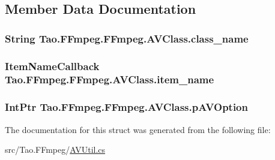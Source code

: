 \subsection{Member Data Documentation}
\hypertarget{struct_tao_1_1_f_fmpeg_1_1_f_fmpeg_1_1_a_v_class_a089edfda9da1bd06b77b27a72ace1340}{
\subsubsection[{class\_\-name}]{\setlength{\rightskip}{0pt plus 5cm}String {\bf Tao.FFmpeg.FFmpeg.AVClass.class\_\-name}}}
\label{struct_tao_1_1_f_fmpeg_1_1_f_fmpeg_1_1_a_v_class_a089edfda9da1bd06b77b27a72ace1340}
\hypertarget{struct_tao_1_1_f_fmpeg_1_1_f_fmpeg_1_1_a_v_class_a23db01a0e2f29743ffc51d507482302b}{
\subsubsection[{item\_\-name}]{\setlength{\rightskip}{0pt plus 5cm}ItemNameCallback {\bf Tao.FFmpeg.FFmpeg.AVClass.item\_\-name}}}
\label{struct_tao_1_1_f_fmpeg_1_1_f_fmpeg_1_1_a_v_class_a23db01a0e2f29743ffc51d507482302b}
\hypertarget{struct_tao_1_1_f_fmpeg_1_1_f_fmpeg_1_1_a_v_class_a0c71baf53f1ee6b70277b34cb2067844}{
\subsubsection[{pAVOption}]{\setlength{\rightskip}{0pt plus 5cm}IntPtr {\bf Tao.FFmpeg.FFmpeg.AVClass.pAVOption}}}
\label{struct_tao_1_1_f_fmpeg_1_1_f_fmpeg_1_1_a_v_class_a0c71baf53f1ee6b70277b34cb2067844}


The documentation for this struct was generated from the following file:\begin{DoxyCompactItemize}
\item 
src/Tao.FFmpeg/\hyperlink{_a_v_util_8cs}{AVUtil.cs}\end{DoxyCompactItemize}
